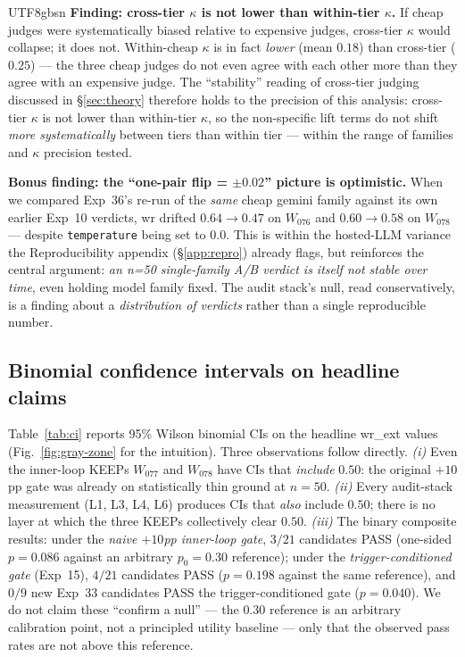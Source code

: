 \documentclass{article}
\begin{document}
\begin{CJK*}{UTF8}{gbsn}
\textbf{Finding: cross-tier \(\kappa\) is not lower than within-tier
\(\kappa\).} If cheap judges were systematically biased relative to
expensive judges, cross-tier \(\kappa\) would collapse; it does not.
Within-cheap \(\kappa\) is in fact \emph{lower} (mean \(0.18\)) than
cross-tier (\(0.25\)) — the three cheap judges do not even agree
with each other more than they agree with an expensive judge. The
``stability'' reading of cross-tier judging discussed in
\S\ref{sec:theory} therefore holds to the precision of this
analysis: cross-tier \(\kappa\) is not lower than within-tier
\(\kappa\), so the non-specific lift terms do not shift
\emph{more systematically} between tiers than within tier ---
within the range of families and \(\kappa\) precision tested.

\textbf{Bonus finding: the ``one-pair flip = \(\pm 0.02\)'' picture
is optimistic.} When we compared Exp~36's re-run of the
\emph{same} cheap gemini family against its own earlier Exp~10
verdicts, wr drifted \(0.64 \to 0.47\) on \(W_{076}\) and
\(0.60 \to 0.58\) on \(W_{078}\) — despite \texttt{temperature} being
set to \(0.0\). This is within the hosted-LLM variance the
Reproducibility appendix (\S\ref{app:repro}) already flags, but
reinforces the central argument: \emph{an n=50 single-family A/B
verdict is itself not stable over time}, even holding model family
fixed. The audit stack's null, read conservatively, is a finding
about a \emph{distribution of verdicts} rather than a single
reproducible number.

\subsection{Binomial confidence intervals on headline claims}
\label{sec:stats}

Table~\ref{tab:ci} reports 95\% Wilson binomial CIs on the
headline wr\_ext values (Fig.~\ref{fig:gray-zone} for the
intuition). Three observations follow directly.
\emph{(i)} Even the inner-loop KEEPs
\(W_{077}\) and \(W_{078}\) have CI\(\text{s}\) that \emph{include}
\(0.50\): the original \(+10\)pp gate was already on statistically
thin ground at \(n = 50\). \emph{(ii)} Every audit-stack measurement
(L1, L3, L4, L6) produces CIs that \emph{also} include \(0.50\);
there is no layer at which the three KEEPs collectively clear
\(0.50\). \emph{(iii)} The binary composite results: under the
\emph{naive \(+10\)pp inner-loop gate}, \(3/21\) candidates PASS
(one-sided \(p = 0.086\) against an arbitrary \(p_0 = 0.30\)
reference); under the \emph{trigger-conditioned gate} (Exp~15),
\(4/21\) candidates PASS (\(p = 0.198\) against the same
reference), and \(0/9\) new Exp~33 candidates PASS the
trigger-conditioned gate (\(p = 0.040\)). We do not claim these
``confirm a null'' --- the \(0.30\) reference is an arbitrary
calibration point, not a principled utility baseline ---
only that the observed pass rates are not above this reference.


\end{CJK*}
\end{document}

